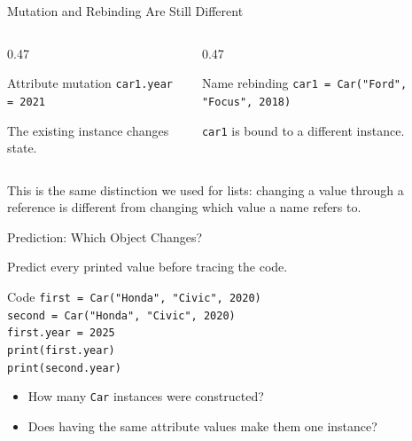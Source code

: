 \documentclass[aspectratio=169,10pt]{beamer}
\begin{document}
\begin{frame}{Mutation and Rebinding Are Still Different}
  \begin{columns}[T,onlytextwidth]
    \begin{column}{0.47\textwidth}
      \begin{block}{Attribute mutation}
        \texttt{car1.year = 2021}
      \end{block}
      The existing instance changes state.
    \end{column}
    \begin{column}{0.47\textwidth}
      \begin{block}{Name rebinding}
        \texttt{car1 = Car("Ford", "Focus", 2018)}
      \end{block}
      \texttt{car1} is bound to a different instance.
    \end{column}
  \end{columns}

  \begin{keyidea}
    This is the same distinction we used for lists: changing a value through a reference is different from changing which value a name refers to.
  \end{keyidea}
\end{frame}

\begin{frame}{Prediction: Which Object Changes?}
  \begin{activity}
    Predict every printed value before tracing the code.
  \end{activity}

  \begin{block}{Code}
    \texttt{first = Car("Honda", "Civic", 2020)}\\
    \texttt{second = Car("Honda", "Civic", 2020)}\\
    \texttt{first.year = 2025}\\[0.06in]
    \texttt{print(first.year)}\\
    \texttt{print(second.year)}
  \end{block}

  \begin{itemize}
    \item How many \texttt{Car} instances were constructed?
    \item Does having the same attribute values make them one instance?
  \end{itemize}
\end{frame}
\end{document}
